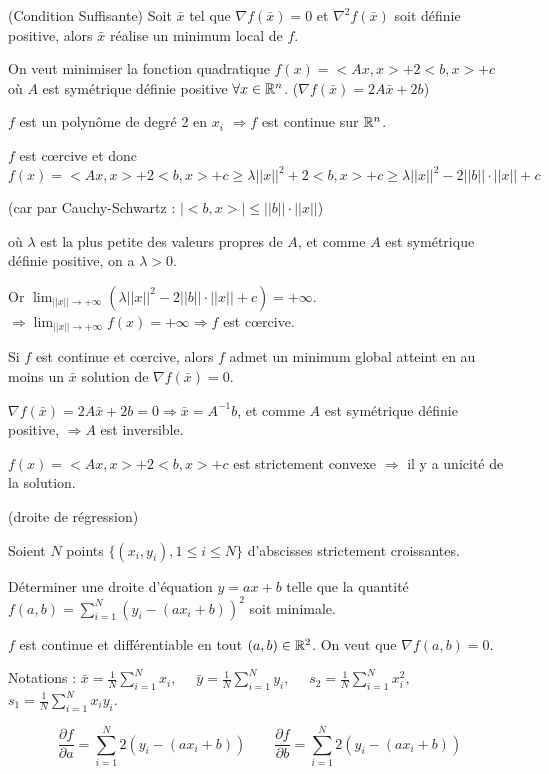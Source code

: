 		\begin{theoreme} (Condition Suffisante)
		Soit $\bar{x}$ tel que $\nabla f(\bar{x}) = 0$ et $\nabla^2 f(\bar{x})$ soit définie positive, alors $\bar{x}$ réalise un minimum local de $f$.
		\end{theoreme}
		
		\begin{exemple}
		
		On veut minimiser la fonction quadratique $f(x) = <Ax, x> +2<b, x> +c$ où $A$ est symétrique définie positive $\forall x \in \mathbb{R}^n$.
		($\nabla f(\bar{x}) = 2A\bar{x} +2b$)
		
		$f$ est un polynôme de degré 2 en $x_i$ $\Rightarrow f$ est continue sur $\mathbb{R}^n$.
		
		$f$ est c\oe rcive et donc 
	 	\[f(x) = <Ax, x>  +2<b, x> +c \geq \lambda ||x||^2 + 2<b, x> +c \geq \lambda ||x||^2 - 2||b|| \cdot ||x|| +c \]
		
		(car par Cauchy-Schwartz : $|<b, x>| \leq ||b|| \cdot ||x||$)
		
		où $\lambda$ est la plus petite des valeurs propres de $A$, et comme $A$ est symétrique définie positive, on a $\lambda >0$.
		
		Or $\displaystyle \lim_{||x|| \rightarrow +\infty}( \lambda ||x||^2 -2||b|| \cdot ||x|| +c) = +\infty$.
		$\displaystyle \Rightarrow \lim_{||x|| \rightarrow +\infty}f(x) = +\infty \Rightarrow f$ est c\oe rcive.
		
		Si $f$ est continue et c\oe rcive, alors $f$ admet un minimum global atteint en au moins un $\bar{x}$ solution de $\nabla f(\bar{x}) = 0$.
		
		$\nabla f(\bar{x}) = 2A\bar{x} +2b = 0 \Rightarrow \bar{x} = A^{-1} b$, et comme $A$ est symétrique définie positive, $\Rightarrow A$ est inversible.
		
		$f(x) = <Ax, x> +2<b, x> +c$ est strictement convexe $\Rightarrow$ il y a unicité de la solution.
		\end{exemple}
		
		\begin{exemple} (droite de régression)
		
		Soient $N$ points $\{(x_i, y_i), 1\leq i \leq N\}$ d'abscisses strictement croissantes.
		
		Déterminer une droite d'équation $y=ax+b$ telle que la quantité $\displaystyle f(a, b) = \sum_{i=1}^N (y_i-(ax_i+b))^2$ soit minimale.
		
		$f$ est continue et différentiable en tout $(a, b) \in \mathbb{R}^2$.
		On veut que $\nabla f(a, b) = 0$.
		
		Notations :
		$\displaystyle \bar{x} = \frac{1}{N} \sum_{i=1}^N x_i, \quad$
		$\displaystyle \bar{y} = \frac{1}{N} \sum_{i=1}^N y_i, \quad$
		$\displaystyle s_2 = \frac{1}{N} \sum_{i=1}^N x_i^2, \quad$
		$\displaystyle s_1 = \frac{1}{N} \sum_{i=1}^N x_i y_i$.
		
		\[ \frac{\partial f}{\partial a} = \sum_{i=1}^N 2(y_i-(ax_i+b)) \quad\quad \frac{\partial f}{\partial b} = \sum_{i=1}^N 2(y_i-(ax_i+b)) \]

		\end{exemple}
		
